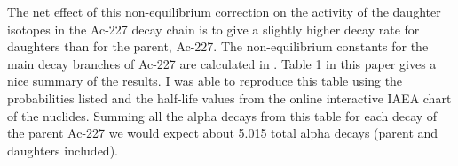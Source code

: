\documentclass[11pt]{article}
\begin{document}
The net effect of this non-equilibrium correction on the activity of the daughter isotopes in the Ac-227 decay chain is to give a slightly higher decay rate for daughters than for the parent, Ac-227. The non-equilibrium constants for the main decay branches of Ac-227 are calculated in \cite{Kossert2015}. Table 1 in this paper gives a nice summary of the results. I was able to reproduce this table using the probabilities listed and the half-life values from the online interactive IAEA chart of the nuclides. Summing all the alpha decays from this table for each decay of the parent Ac-227 we would expect about 5.015 total alpha decays (parent and daughters included).













\end{document}
